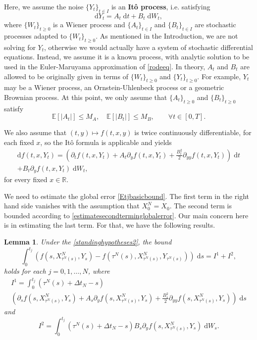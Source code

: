 \documentclass[reqno,12pt]{amsart}
\theoremstyle{plain}%
\newtheorem{lem}{Lemma}[section]
\theoremstyle{definition}
\begin{document}
Here, we assume the noise $\{Y_t\}_{t\in I}$ is an \textbf{It\^o process}, i.e. satisfying
\begin{equation}
  \label{itoprocess}
  \mathrm{d}Y_t = A_t \;\mathrm{d}t + B_t \;\mathrm{d}W_t,
\end{equation}
where $\{W_t\}_{t\geq 0}$ is a Wiener process and $\{A_t\}_{t \in I}$ and $\{B_t\}_{t \in I}$ are stochastic processes adapted to $\{W_t\}_{t\geq 0}$. As mentioned in the Introduction, we are not solving for $Y_t$, otherwise we would actually have a system of stochastic differential equations. Instead, we assume it is a known process, with analytic solution to be used in the Euler-Maruyama approximation of \eqref{rodeeq}. In theory, $A_t$ and $B_t$ are allowed to be originally given in terms of $\{W_t\}_{t\geq 0}$ and $\{Y_t\}_{t\geq 0}$. For example, $Y_t$ may be a Wiener process, an Ornstein-Uhlenbeck process or a geometric Brownian process. At this point, we only assume that $\{A_t\}_{t \geq 0}$ and $\{B_t\}_{t \geq 0}$ satisfy
\begin{equation}
    \label{EAtEBtbound}
    \mathbb{E}[|A_t|] \leq M_A, \quad \mathbb{E}[|B_t|] \leq M_B, \qquad \forall t \in [0, T].
\end{equation}

We also assume that $(t, y) \mapsto f(t, x, y)$ is twice continuously differentiable, for each fixed $x$, so the It\^o formula is applicable and yields
\begin{multline}
  \label{itoformula}
  \mathrm{d}f(t, x, Y_t) = \left(\partial_t f(t, x, Y_t) + A_t \partial_y f(t, x, Y_t)  + \frac{B_t^2}{2}\partial_{yy}f(t, x, Y_t) \right) \;\mathrm{d}t \\ + B_t \partial_y f(t, x, Y_t)\;\mathrm{d}W_t,
\end{multline}
for every fixed $x\in \mathbb{R}$.

We need to estimate the global error \eqref{Etjbasicbound}. The first term in the right hand side vanishes with the assumption that $X_0^N = X_0$. The second term is bounded according to \cref{estimatesecondterminglobalerror}. Our main concern here is in estimating the last term. For that, we have the following results.

\begin{lem}
    \label{lemrewritenoiseterm}
    Under the \cref{standinghypotheses2}, the bound
    \begin{equation}
        \label{rewritenoiseterm}
        \int_0^{t_j} \left( f(s, X_{\tau^N(s)}^N, Y_s) - f(\tau^N(s), X_{\tau^N(s)}^N, Y_{\tau^N(s)}) \right)\;\mathrm{d}s = I^1 + I^2,
    \end{equation}
    holds for each $j = 0, 1, \ldots, N$, where
    \begin{multline*}
        I^1 = \int_0^{t_j} (\tau^N(s) + \Delta t_N - s) \\
        \left(\partial_s f(s, X_{\tau^N(s)}^N, Y_s) + A_s \partial_y f(s, X_{\tau^N(s)}^N, Y_s)  + \frac{B_s^2}{2}\partial_{yy}f(s, X_{\tau^N(s)}^N, Y_s) \right) \;\mathrm{d}s
    \end{multline*}
    and
    \[
        I^2 = \int_0^{t_j} (\tau^N(s) + \Delta t_N - s) B_s \partial_y f(s, X_{\tau^N(s)}^N, Y_s) \;\mathrm{d}W_s.
    \]
\end{lem}
\end{document}
